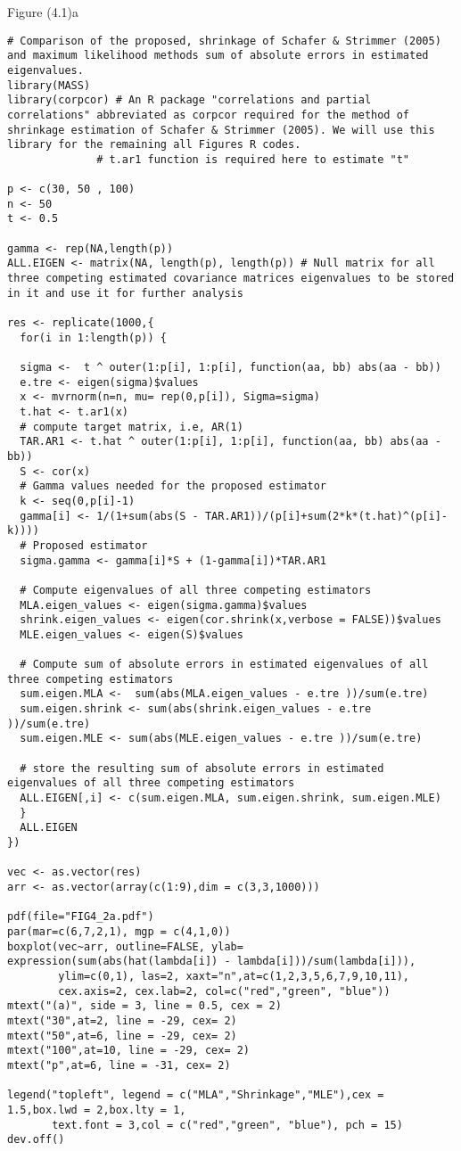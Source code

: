 Figure (4.1)a
\begin{lstlisting}
# Comparison of the proposed, shrinkage of Schafer & Strimmer (2005) and maximum likelihood methods sum of absolute errors in estimated eigenvalues.
library(MASS)
library(corpcor) # An R package "correlations and partial correlations" abbreviated as corpcor required for the method of shrinkage estimation of Schafer & Strimmer (2005). We will use this library for the remaining all Figures R codes.
              # t.ar1 function is required here to estimate "t"

p <- c(30, 50 , 100)
n <- 50
t <- 0.5

gamma <- rep(NA,length(p))
ALL.EIGEN <- matrix(NA, length(p), length(p)) # Null matrix for all three competing estimated covariance matrices eigenvalues to be stored in it and use it for further analysis 

res <- replicate(1000,{
  for(i in 1:length(p)) {
    
  sigma <-  t ^ outer(1:p[i], 1:p[i], function(aa, bb) abs(aa - bb))
  e.tre <- eigen(sigma)$values
  x <- mvrnorm(n=n, mu= rep(0,p[i]), Sigma=sigma)
  t.hat <- t.ar1(x)
  # compute target matrix, i.e, AR(1)
  TAR.AR1 <- t.hat ^ outer(1:p[i], 1:p[i], function(aa, bb) abs(aa - bb))
  S <- cor(x)
  # Gamma values needed for the proposed estimator
  k <- seq(0,p[i]-1)
  gamma[i] <- 1/(1+sum(abs(S - TAR.AR1))/(p[i]+sum(2*k*(t.hat)^(p[i]-k))))
  # Proposed estimator
  sigma.gamma <- gamma[i]*S + (1-gamma[i])*TAR.AR1
  
  # Compute eigenvalues of all three competing estimators
  MLA.eigen_values <- eigen(sigma.gamma)$values
  shrink.eigen_values <- eigen(cor.shrink(x,verbose = FALSE))$values
  MLE.eigen_values <- eigen(S)$values
   
  # Compute sum of absolute errors in estimated eigenvalues of all three competing estimators
  sum.eigen.MLA <-  sum(abs(MLA.eigen_values - e.tre ))/sum(e.tre)
  sum.eigen.shrink <- sum(abs(shrink.eigen_values - e.tre ))/sum(e.tre)
  sum.eigen.MLE <- sum(abs(MLE.eigen_values - e.tre ))/sum(e.tre)
  
  # store the resulting sum of absolute errors in estimated eigenvalues of all three competing estimators
  ALL.EIGEN[,i] <- c(sum.eigen.MLA, sum.eigen.shrink, sum.eigen.MLE)
  }
  ALL.EIGEN
})

vec <- as.vector(res)
arr <- as.vector(array(c(1:9),dim = c(3,3,1000)))

pdf(file="FIG4_2a.pdf")
par(mar=c(6,7,2,1), mgp = c(4,1,0))
boxplot(vec~arr, outline=FALSE, ylab= expression(sum(abs(hat(lambda[i]) - lambda[i]))/sum(lambda[i])),
        ylim=c(0,1), las=2, xaxt="n",at=c(1,2,3,5,6,7,9,10,11),
        cex.axis=2, cex.lab=2, col=c("red","green", "blue"))
mtext("(a)", side = 3, line = 0.5, cex = 2)
mtext("30",at=2, line = -29, cex= 2)
mtext("50",at=6, line = -29, cex= 2)
mtext("100",at=10, line = -29, cex= 2)
mtext("p",at=6, line = -31, cex= 2)

legend("topleft", legend = c("MLA","Shrinkage","MLE"),cex = 1.5,box.lwd = 2,box.lty = 1,
       text.font = 3,col = c("red","green", "blue"), pch = 15)
dev.off()
\end{lstlisting}

